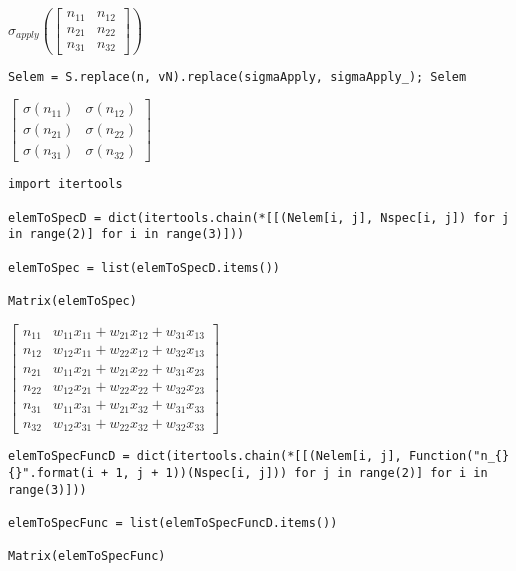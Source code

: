\documentclass[
]{article}
\begin{document}
\(\displaystyle \sigma_{apply}{\left(\left[\begin{matrix}n_{11} & n_{12}\\n_{21} & n_{22}\\n_{31} & n_{32}\end{matrix}\right] \right)}\)

\begin{verbatim}
Selem = S.replace(n, vN).replace(sigmaApply, sigmaApply_); Selem
\end{verbatim}

\(\displaystyle \left[\begin{matrix}\sigma{\left(n_{11} \right)} & \sigma{\left(n_{12} \right)}\\\sigma{\left(n_{21} \right)} & \sigma{\left(n_{22} \right)}\\\sigma{\left(n_{31} \right)} & \sigma{\left(n_{32} \right)}\end{matrix}\right]\)

\begin{verbatim}
import itertools

elemToSpecD = dict(itertools.chain(*[[(Nelem[i, j], Nspec[i, j]) for j in range(2)] for i in range(3)]))

elemToSpec = list(elemToSpecD.items())

Matrix(elemToSpec)
\end{verbatim}

\(\displaystyle \left[\begin{matrix}n_{11} & w_{11} x_{11} + w_{21} x_{12} + w_{31} x_{13}\\n_{12} & w_{12} x_{11} + w_{22} x_{12} + w_{32} x_{13}\\n_{21} & w_{11} x_{21} + w_{21} x_{22} + w_{31} x_{23}\\n_{22} & w_{12} x_{21} + w_{22} x_{22} + w_{32} x_{23}\\n_{31} & w_{11} x_{31} + w_{21} x_{32} + w_{31} x_{33}\\n_{32} & w_{12} x_{31} + w_{22} x_{32} + w_{32} x_{33}\end{matrix}\right]\)

\begin{verbatim}
elemToSpecFuncD = dict(itertools.chain(*[[(Nelem[i, j], Function("n_{}{}".format(i + 1, j + 1))(Nspec[i, j])) for j in range(2)] for i in range(3)]))

elemToSpecFunc = list(elemToSpecFuncD.items())

Matrix(elemToSpecFunc)
\end{verbatim}
\end{document}
